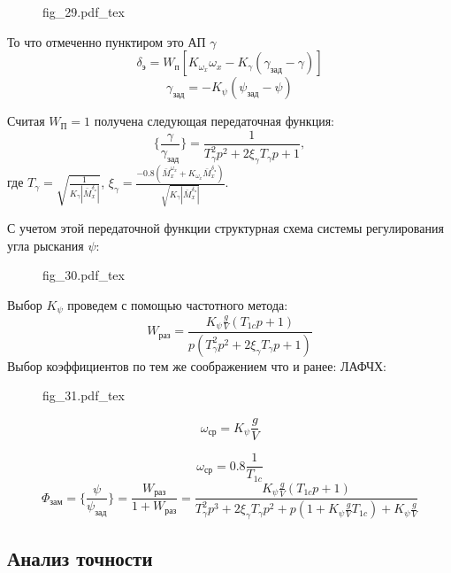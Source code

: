 \documentclass{article}
\begin{document}
\begin{figure}[H]
\centering
{fig_29.pdf_tex}
\end{figure}

То что отмеченно пунктиром это АП $\gamma$
\[
\delta_э = W_{п}[K_{\omega_x}\omega_x - K_{\gamma}(\gamma_{зад} - \gamma)]
\]
\[
\gamma_{зад} = -K_{\psi}(\psi_{зад} - \psi)
\]

Считая $W_П = 1$ получена следующая передаточная функция:
\[
\{\frac{\gamma}{\gamma_{зад}} \}=\frac{1}{T_{\gamma}^2 p^2 + 2 \xi_{\gamma} T_\gamma p + 1},
\]
где $T_{\gamma} = \sqrt{\frac{1}{K_{\gamma}|\bar{M}_x^{\delta_э}|}}$, $\xi_{\gamma} =\frac{-0.8(\bar{M}_x^{\omega_x} + K_{\omega_x} \bar{M}_x^{\delta_э})}{\sqrt{K_\gamma |\bar{M}_x^{\delta_э}|}}$.

С учетом этой передаточной функции структурная схема системы регулирования угла рыскания $\psi$:

\begin{figure}[H]
\centering
{fig_30.pdf_tex}
\end{figure}

Выбор $K_{\psi}$ проведем с помощью частотного метода:
\[
W_{раз} = \frac{K_{\psi} \frac{g}{V} (T_{1c}p + 1)}{p(T_{\gamma}^2 p^2 + 2 \xi_\gamma T_\gamma p + 1)}
\]
Выбор коэффициентов по тем же соображением что и ранее:
ЛАФЧХ:
\begin{figure}[H]
\centering
{fig_31.pdf_tex}
\end{figure}

\[
\omega_{ср} = K_{\psi}\frac{g}{V} 
\]

\[
\omega_{ср} = 0.8\frac{1}{T_{1c}} 
\]
\[
\Phi_{зам} = \{\frac{\psi}{\psi_{зад}} \} = \frac{W_{раз}}{1 + W_{раз}} = \frac{K_{\psi}\frac{g}{V}(T_{1c}p + 1)}{T_{\gamma}^2 p^3 + 2\xi_\gamma T_\gamma p^2 + p(1 + K_{\psi}\frac{g}{V} T_{1c}) + K_{\psi}\frac{g}{V}}
\]

\subsection{Анализ точности}
\end{document}
